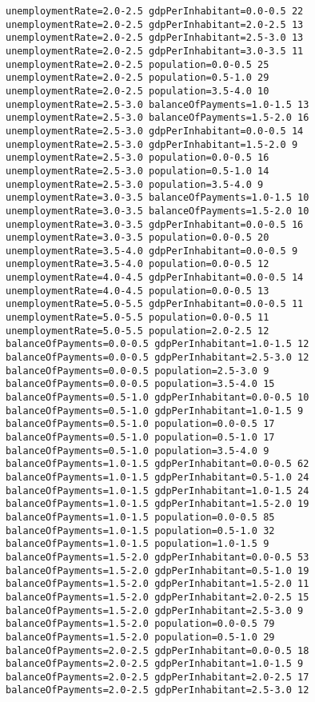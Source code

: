 \begin{lstlisting}[basicstyle=\footnotesize\ttfamily,numbers=none]
unemploymentRate=2.0-2.5 gdpPerInhabitant=0.0-0.5 22
unemploymentRate=2.0-2.5 gdpPerInhabitant=2.0-2.5 13
unemploymentRate=2.0-2.5 gdpPerInhabitant=2.5-3.0 13
unemploymentRate=2.0-2.5 gdpPerInhabitant=3.0-3.5 11
unemploymentRate=2.0-2.5 population=0.0-0.5 25
unemploymentRate=2.0-2.5 population=0.5-1.0 29
unemploymentRate=2.0-2.5 population=3.5-4.0 10
unemploymentRate=2.5-3.0 balanceOfPayments=1.0-1.5 13
unemploymentRate=2.5-3.0 balanceOfPayments=1.5-2.0 16
unemploymentRate=2.5-3.0 gdpPerInhabitant=0.0-0.5 14
unemploymentRate=2.5-3.0 gdpPerInhabitant=1.5-2.0 9
unemploymentRate=2.5-3.0 population=0.0-0.5 16
unemploymentRate=2.5-3.0 population=0.5-1.0 14
unemploymentRate=2.5-3.0 population=3.5-4.0 9
unemploymentRate=3.0-3.5 balanceOfPayments=1.0-1.5 10
unemploymentRate=3.0-3.5 balanceOfPayments=1.5-2.0 10
unemploymentRate=3.0-3.5 gdpPerInhabitant=0.0-0.5 16
unemploymentRate=3.0-3.5 population=0.0-0.5 20
unemploymentRate=3.5-4.0 gdpPerInhabitant=0.0-0.5 9
unemploymentRate=3.5-4.0 population=0.0-0.5 12
unemploymentRate=4.0-4.5 gdpPerInhabitant=0.0-0.5 14
unemploymentRate=4.0-4.5 population=0.0-0.5 13
unemploymentRate=5.0-5.5 gdpPerInhabitant=0.0-0.5 11
unemploymentRate=5.0-5.5 population=0.0-0.5 11
unemploymentRate=5.0-5.5 population=2.0-2.5 12
balanceOfPayments=0.0-0.5 gdpPerInhabitant=1.0-1.5 12
balanceOfPayments=0.0-0.5 gdpPerInhabitant=2.5-3.0 12
balanceOfPayments=0.0-0.5 population=2.5-3.0 9
balanceOfPayments=0.0-0.5 population=3.5-4.0 15
balanceOfPayments=0.5-1.0 gdpPerInhabitant=0.0-0.5 10
balanceOfPayments=0.5-1.0 gdpPerInhabitant=1.0-1.5 9
balanceOfPayments=0.5-1.0 population=0.0-0.5 17
balanceOfPayments=0.5-1.0 population=0.5-1.0 17
balanceOfPayments=0.5-1.0 population=3.5-4.0 9
balanceOfPayments=1.0-1.5 gdpPerInhabitant=0.0-0.5 62
balanceOfPayments=1.0-1.5 gdpPerInhabitant=0.5-1.0 24
balanceOfPayments=1.0-1.5 gdpPerInhabitant=1.0-1.5 24
balanceOfPayments=1.0-1.5 gdpPerInhabitant=1.5-2.0 19
balanceOfPayments=1.0-1.5 population=0.0-0.5 85
balanceOfPayments=1.0-1.5 population=0.5-1.0 32
balanceOfPayments=1.0-1.5 population=1.0-1.5 9
balanceOfPayments=1.5-2.0 gdpPerInhabitant=0.0-0.5 53
balanceOfPayments=1.5-2.0 gdpPerInhabitant=0.5-1.0 19
balanceOfPayments=1.5-2.0 gdpPerInhabitant=1.5-2.0 11
balanceOfPayments=1.5-2.0 gdpPerInhabitant=2.0-2.5 15
balanceOfPayments=1.5-2.0 gdpPerInhabitant=2.5-3.0 9
balanceOfPayments=1.5-2.0 population=0.0-0.5 79
balanceOfPayments=1.5-2.0 population=0.5-1.0 29
balanceOfPayments=2.0-2.5 gdpPerInhabitant=0.0-0.5 18
balanceOfPayments=2.0-2.5 gdpPerInhabitant=1.0-1.5 9
balanceOfPayments=2.0-2.5 gdpPerInhabitant=2.0-2.5 17
balanceOfPayments=2.0-2.5 gdpPerInhabitant=2.5-3.0 12

\end{lstlisting}
